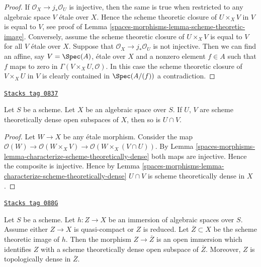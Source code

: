 \begin{proof}
If $\mathcal{O}_X \to j_*\mathcal{O}_U$ is injective,
then the same is true when restricted to any
algebraic space $V$ \'etale over $X$.
Hence the scheme theoretic closure of $U \times_X V$ in $V$
is equal to $V$, see proof of
Lemma \ref{spaces-morphisms-lemma-scheme-theoretic-image}.
Conversely, assume the scheme theoretic
closure of $U \times_X V$ is equal to $V$ for all $V$ \'etale over $X$.
Suppose that $\mathcal{O}_X \to j_*\mathcal{O}_U$ is not injective.
Then we can find an affine, say $V = \Spec(A)$, \'etale over $X$
and a nonzero element $f \in A$ such that $f$ maps to zero in
$\Gamma(V \times_X U, \mathcal{O})$. In this case the scheme theoretic
closure of $V \times_X U$ in $V$ is clearly contained in $\Spec(A/(f))$
a contradiction.
\end{proof}

\begin{lemma}
\label{spaces-morphisms-lemma-intersection-scheme-theoretically-dense}
\href{https://stacks.math.columbia.edu/tag/0837}{\texttt{Stacks tag 0837}}

Let $S$ be a scheme. Let $X$ be an algebraic space over $S$.
If $U$, $V$ are scheme theoretically dense
open subspaces of $X$, then so is $U \cap V$.
\end{lemma}

\begin{proof}
Let $W \to X$ be any \'etale morphism. Consider the map
$\mathcal{O}(W) \to \mathcal{O}(W \times_X V)
\to \mathcal{O}(W \times_X (V \cap U))$.
By Lemma \ref{spaces-morphisms-lemma-characterize-scheme-theoretically-dense}
both maps are injective. Hence the composite is injective.
Hence by Lemma \ref{spaces-morphisms-lemma-characterize-scheme-theoretically-dense}
$U \cap V$ is scheme theoretically dense in $X$.
\end{proof}

\begin{lemma}
\label{spaces-morphisms-lemma-quasi-compact-immersion}
\href{https://stacks.math.columbia.edu/tag/088G}{\texttt{Stacks tag 088G}}

Let $S$ be a scheme. Let $h : Z \to X$ be an immersion of algebraic spaces
over $S$. Assume either $Z \to X$ is quasi-compact or $Z$ is reduced.
Let $\overline{Z} \subset X$ be the scheme theoretic image of $h$.
Then the morphism $Z \to \overline{Z}$ is an open immersion
which identifies $Z$ with a scheme theoretically dense open
subspace of $\overline{Z}$. Moreover, $Z$ is topologically
dense in $\overline{Z}$.
\end{lemma}

